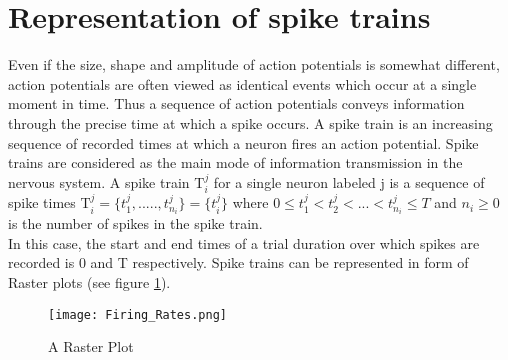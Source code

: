 



\section{Representation of spike trains}
Even if the size, shape and amplitude of action potentials is somewhat different,
action potentials are often viewed as identical events which occur at a single moment in time. Thus a sequence of action potentials conveys information through the precise time at which  a spike occurs. A spike train is an increasing sequence of recorded times at which a neuron fires an action potential. Spike trains are considered as the main mode of information transmission in the nervous system.  A spike train T$_{i}^{j}$ for  a single neuron labeled j is a sequence of spike times T$_{i}^{j} = \{t_{1}^{j}, ....., t_{n_{i}}^{j} \} = \{t_{i}^{j}\}$ where $0 \leq t_{1}^{j} < t_{2}^{j}< ... < t_{n_{i}}^{j} \leq T$  and  $n_{i} \geq 0$ is the number of spikes in the spike train.\\
In this case, the start and end times of a trial duration over which spikes are recorded is 0 and T respectively. Spike trains can be represented in form of Raster plots (see figure \ref{fig:Raster}).\\
 
 \begin{figure}[H]
  \centering
    \texttt{[image: Firing\_Rates.png]}
     \caption{A Raster Plot}
      \label{fig:Raster}
\end{figure}

